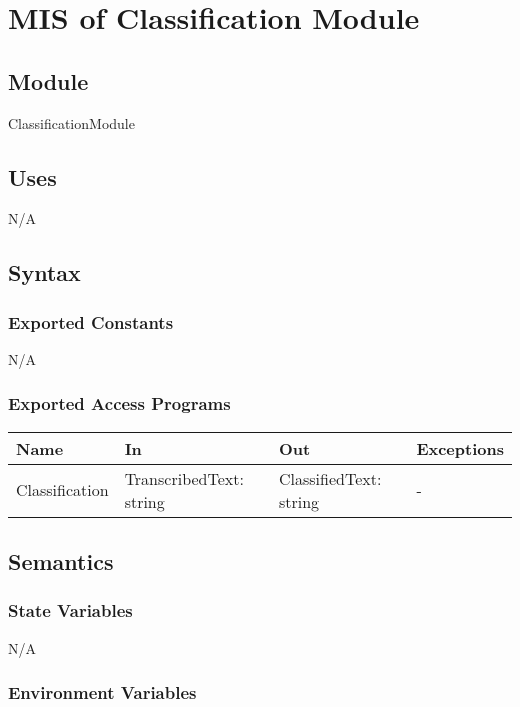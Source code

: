 \documentclass[12pt, titlepage]{article}
\begin{document}
\section{MIS of Classification Module} \label{Classification_Module} 

\subsection{Module}

ClassificationModule

\subsection{Uses}

N/A

\subsection{Syntax}

\subsubsection{Exported Constants}

N/A

\subsubsection{Exported Access Programs}

\begin{center}
\begin{tabular}{p{2cm} p{4cm} p{4cm} p{2cm}}
\hline
\textbf{Name} & \textbf{In} & \textbf{Out} & \textbf{Exceptions} \\
\hline
Classification & TranscribedText: string & ClassifiedText: string & - & \\
\hline
\end{tabular}
\end{center}

\subsection{Semantics}

\subsubsection{State Variables}

N/A

\subsubsection{Environment Variables}
\end{document}
